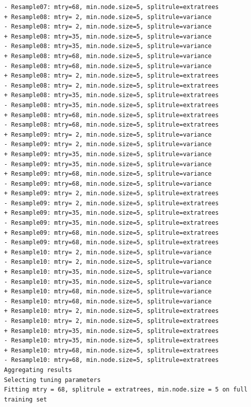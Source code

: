 \documentclass[
  letterpaper,
  DIV=11,
  numbers=noendperiod]{scrartcl}
\newenvironment{Shaded}{\begin{snugshade}}{\end{snugshade}}
\newcommand{\AttributeTok}[1]{\textcolor[rgb]{0.40,0.45,0.13}{#1}}
\newcommand{\FunctionTok}[1]{\textcolor[rgb]{0.28,0.35,0.67}{#1}}
\newcommand{\NormalTok}[1]{\textcolor[rgb]{0.00,0.23,0.31}{#1}}
\newcommand{\OtherTok}[1]{\textcolor[rgb]{0.00,0.23,0.31}{#1}}
\newcommand{\SpecialCharTok}[1]{\textcolor[rgb]{0.37,0.37,0.37}{#1}}
\begin{document}
\begin{verbatim}
- Resample07: mtry=68, min.node.size=5, splitrule=extratrees 
+ Resample08: mtry= 2, min.node.size=5, splitrule=variance 
- Resample08: mtry= 2, min.node.size=5, splitrule=variance 
+ Resample08: mtry=35, min.node.size=5, splitrule=variance 
- Resample08: mtry=35, min.node.size=5, splitrule=variance 
+ Resample08: mtry=68, min.node.size=5, splitrule=variance 
- Resample08: mtry=68, min.node.size=5, splitrule=variance 
+ Resample08: mtry= 2, min.node.size=5, splitrule=extratrees 
- Resample08: mtry= 2, min.node.size=5, splitrule=extratrees 
+ Resample08: mtry=35, min.node.size=5, splitrule=extratrees 
- Resample08: mtry=35, min.node.size=5, splitrule=extratrees 
+ Resample08: mtry=68, min.node.size=5, splitrule=extratrees 
- Resample08: mtry=68, min.node.size=5, splitrule=extratrees 
+ Resample09: mtry= 2, min.node.size=5, splitrule=variance 
- Resample09: mtry= 2, min.node.size=5, splitrule=variance 
+ Resample09: mtry=35, min.node.size=5, splitrule=variance 
- Resample09: mtry=35, min.node.size=5, splitrule=variance 
+ Resample09: mtry=68, min.node.size=5, splitrule=variance 
- Resample09: mtry=68, min.node.size=5, splitrule=variance 
+ Resample09: mtry= 2, min.node.size=5, splitrule=extratrees 
- Resample09: mtry= 2, min.node.size=5, splitrule=extratrees 
+ Resample09: mtry=35, min.node.size=5, splitrule=extratrees 
- Resample09: mtry=35, min.node.size=5, splitrule=extratrees 
+ Resample09: mtry=68, min.node.size=5, splitrule=extratrees 
- Resample09: mtry=68, min.node.size=5, splitrule=extratrees 
+ Resample10: mtry= 2, min.node.size=5, splitrule=variance 
- Resample10: mtry= 2, min.node.size=5, splitrule=variance 
+ Resample10: mtry=35, min.node.size=5, splitrule=variance 
- Resample10: mtry=35, min.node.size=5, splitrule=variance 
+ Resample10: mtry=68, min.node.size=5, splitrule=variance 
- Resample10: mtry=68, min.node.size=5, splitrule=variance 
+ Resample10: mtry= 2, min.node.size=5, splitrule=extratrees 
- Resample10: mtry= 2, min.node.size=5, splitrule=extratrees 
+ Resample10: mtry=35, min.node.size=5, splitrule=extratrees 
- Resample10: mtry=35, min.node.size=5, splitrule=extratrees 
+ Resample10: mtry=68, min.node.size=5, splitrule=extratrees 
- Resample10: mtry=68, min.node.size=5, splitrule=extratrees 
Aggregating results
Selecting tuning parameters
Fitting mtry = 68, splitrule = extratrees, min.node.size = 5 on full training set
\end{verbatim}

\begin{Shaded}
\end{Shaded}
\end{document}
